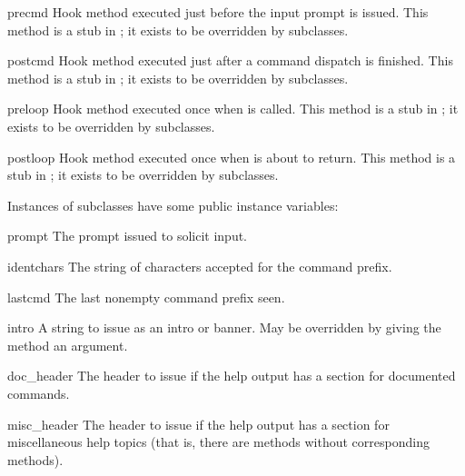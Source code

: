 \begin{methoddesc}{precmd}{}
Hook method executed just before the input prompt is issued.  This
method is a stub in ; it exists to be overridden by
subclasses.
\end{methoddesc}

\begin{methoddesc}{postcmd}{}
Hook method executed just after a command dispatch is finished.  This
method is a stub in ; it exists to be overridden by
subclasses.
\end{methoddesc}

\begin{methoddesc}{preloop}{}
Hook method executed once when  is called.  This
method is a stub in ; it exists to be overridden by
subclasses.
\end{methoddesc}

\begin{methoddesc}{postloop}{}
Hook method executed once when  is about to return.
This method is a stub in ; it exists to be overridden by
subclasses.
\end{methoddesc}

Instances of  subclasses have some public instance variables:

\begin{memberdesc}{prompt}
The prompt issued to solicit input.
\end{memberdesc}

\begin{memberdesc}{identchars}
The string of characters accepted for the command prefix.
\end{memberdesc}

\begin{memberdesc}{lastcmd}
The last nonempty command prefix seen. 
\end{memberdesc}

\begin{memberdesc}{intro}
A string to issue as an intro or banner.  May be overridden by giving
the  method an argument.
\end{memberdesc}

\begin{memberdesc}{doc_header}
The header to issue if the help output has a section for documented
commands.
\end{memberdesc}

\begin{memberdesc}{misc_header}
The header to issue if the help output has a section for miscellaneous 
help topics (that is, there are  methods without
corresponding  methods).
\end{memberdesc}

